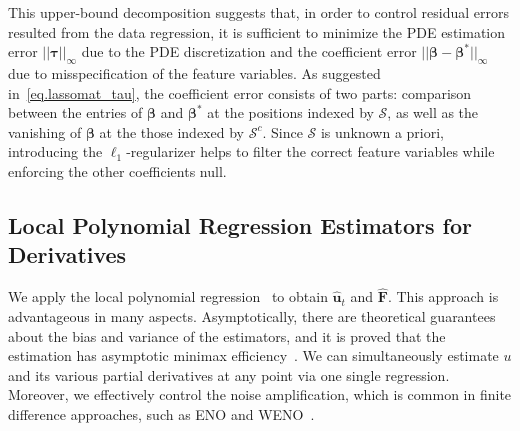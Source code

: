 \documentclass[a4paper,11pt]{article}
\newcommand{\btau}{\bm{\tau}}
\newcommand{\bbeta}{\bm{\beta}}
\newcommand{\bF}{\mathbf{F}}
\newcommand{\mS}{\mathcal{S}}
\newcommand{\bu}{\mathbf{u}}
\begin{document}
This upper-bound decomposition suggests that, in order to control residual errors resulted from the data regression, it is sufficient to minimize the PDE estimation error $||\btau||_\infty$ due to the PDE discretization and the coefficient error $||\bbeta-\bbeta^*||_\infty$ due to misspecification of the feature variables. As suggested in~\eqref{eq.lassomat_tau}, the coefficient error consists of two parts: comparison between the entries of $\bbeta$ and $\bbeta^*$ at the positions indexed by $\mS$, as well as the vanishing of $\bbeta$ at the those indexed by $\mS^c$. Since $\mS$ is unknown a priori, introducing the $\ell_1$-regularizer helps to filter  the correct feature variables while enforcing the other coefficients null. 


\subsection{Local Polynomial Regression Estimators for Derivatives}


We apply the local polynomial regression~\cite{fan1997local} to obtain $\widehat{\bu}_t$ and $\widehat{\bF}$. This approach is advantageous in many aspects. Asymptotically, there are theoretical guarantees about the bias and variance of the estimators, and it is proved that the estimation has asymptotic minimax efficiency~\cite{fan1997local}. We can simultaneously estimate $u$ and its various partial derivatives at any point via one single regression. Moreover, we effectively control the noise amplification, which is common in finite difference approaches, such as ENO and WENO~\cite{shu1999high}.     
\end{document}
